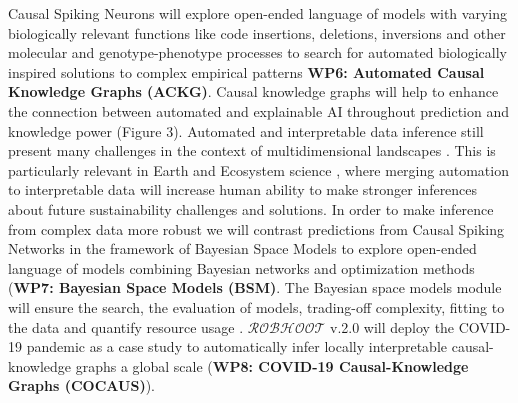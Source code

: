 \documentclass[12pt, a4paper]{article} %
\begin{document}
   Causal Spiking Neurons will explore open-ended language of models
   with varying biologically relevant functions like code insertions,
   deletions, inversions and other molecular and genotype-phenotype
   processes to search for automated biologically inspired solutions
   to complex empirical patterns {\bf WP6: Automated Causal Knowledge
     Graphs (ACKG)}. Causal knowledge graphs will help to enhance the
   connection between automated and explainable AI throughout
   prediction and knowledge power (Figure 3). Automated and
   interpretable data inference still present many challenges in the
   context of multidimensional landscapes
   \citep{OHare2015,Cranmer2019}. This is particularly relevant in
   Earth and Ecosystem science \citep{Reichstein}, where merging
   automation to interpretable data will increase human ability to
   make stronger inferences about future sustainability challenges and
   solutions. In order to make inference from complex data more robust
   we will contrast predictions from Causal Spiking Networks in the
   framework of Bayesian Space Models to explore open-ended language
   of models combining Bayesian networks and optimization methods
   ({\bf WP7: Bayesian Space Models (BSM)}. The Bayesian space models
   module will ensure the search, the evaluation of models,
   trading-off complexity, fitting to the data and quantify resource
   usage \citep{Guimera2020,Steinruecken}. $\mathcal{ROBHOOT}$ v.2.0
   will deploy the COVID-19 pandemic as a case study to automatically
   infer locally interpretable causal-knowledge graphs a global scale
   ({\bf WP8: COVID-19 Causal-Knowledge Graphs (COCAUS)}).
\end{document}
